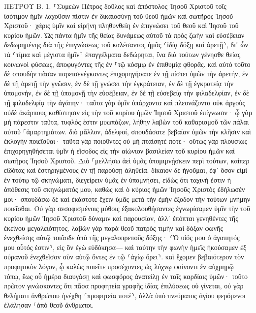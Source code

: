 \documentclass[twoside, 9pt]{extreport}
\begin{document}
ΠΕΤΡΟΥ Β.
1.
⸀Συμεὼν Πέτρος δοῦλος καὶ ἀπόστολος Ἰησοῦ Χριστοῦ τοῖς ἰσότιμον ἡμῖν λαχοῦσιν πίστιν ἐν δικαιοσύνῃ τοῦ θεοῦ ἡμῶν καὶ σωτῆρος Ἰησοῦ Χριστοῦ· 
χάρις ὑμῖν καὶ εἰρήνη πληθυνθείη ἐν ἐπιγνώσει τοῦ θεοῦ καὶ Ἰησοῦ τοῦ κυρίου ἡμῶν. 
Ὡς πάντα ἡμῖν τῆς θείας δυνάμεως αὐτοῦ τὰ πρὸς ζωὴν καὶ εὐσέβειαν δεδωρημένης διὰ τῆς ἐπιγνώσεως τοῦ καλέσαντος ἡμᾶς ⸂ἰδίᾳ δόξῃ καὶ ἀρετῇ⸃, 
δι᾽ ὧν τὰ ⸂τίμια καὶ μέγιστα ἡμῖν⸃ ἐπαγγέλματα δεδώρηται, ἵνα διὰ τούτων γένησθε θείας κοινωνοὶ φύσεως, ἀποφυγόντες τῆς ἐν ⸀τῷ κόσμῳ ἐν ἐπιθυμίᾳ φθορᾶς. 
καὶ αὐτὸ τοῦτο δὲ σπουδὴν πᾶσαν παρεισενέγκαντες ἐπιχορηγήσατε ἐν τῇ πίστει ὑμῶν τὴν ἀρετήν, ἐν δὲ τῇ ἀρετῇ τὴν γνῶσιν, 
ἐν δὲ τῇ γνώσει τὴν ἐγκράτειαν, ἐν δὲ τῇ ἐγκρατείᾳ τὴν ὑπομονήν, ἐν δὲ τῇ ὑπομονῇ τὴν εὐσέβειαν, 
ἐν δὲ τῇ εὐσεβείᾳ τὴν φιλαδελφίαν, ἐν δὲ τῇ φιλαδελφίᾳ τὴν ἀγάπην· 
ταῦτα γὰρ ὑμῖν ὑπάρχοντα καὶ πλεονάζοντα οὐκ ἀργοὺς οὐδὲ ἀκάρπους καθίστησιν εἰς τὴν τοῦ κυρίου ἡμῶν Ἰησοῦ Χριστοῦ ἐπίγνωσιν· 
ᾧ γὰρ μὴ πάρεστιν ταῦτα, τυφλός ἐστιν μυωπάζων, λήθην λαβὼν τοῦ καθαρισμοῦ τῶν πάλαι αὐτοῦ ⸀ἁμαρτημάτων. 
διὸ μᾶλλον, ἀδελφοί, σπουδάσατε βεβαίαν ὑμῶν τὴν κλῆσιν καὶ ἐκλογὴν ποιεῖσθαι· ταῦτα γὰρ ποιοῦντες οὐ μὴ πταίσητέ ποτε· 
οὕτως γὰρ πλουσίως ἐπιχορηγηθήσεται ὑμῖν ἡ εἴσοδος εἰς τὴν αἰώνιον βασιλείαν τοῦ κυρίου ἡμῶν καὶ σωτῆρος Ἰησοῦ Χριστοῦ. 
Διὸ ⸀μελλήσω ἀεὶ ὑμᾶς ὑπομιμνῄσκειν περὶ τούτων, καίπερ εἰδότας καὶ ἐστηριγμένους ἐν τῇ παρούσῃ ἀληθείᾳ. 
δίκαιον δὲ ἡγοῦμαι, ἐφ᾽ ὅσον εἰμὶ ἐν τούτῳ τῷ σκηνώματι, διεγείρειν ὑμᾶς ἐν ὑπομνήσει, 
εἰδὼς ὅτι ταχινή ἐστιν ἡ ἀπόθεσις τοῦ σκηνώματός μου, καθὼς καὶ ὁ κύριος ἡμῶν Ἰησοῦς Χριστὸς ἐδήλωσέν μοι· 
σπουδάσω δὲ καὶ ἑκάστοτε ἔχειν ὑμᾶς μετὰ τὴν ἐμὴν ἔξοδον τὴν τούτων μνήμην ποιεῖσθαι. 
Οὐ γὰρ σεσοφισμένοις μύθοις ἐξακολουθήσαντες ἐγνωρίσαμεν ὑμῖν τὴν τοῦ κυρίου ἡμῶν Ἰησοῦ Χριστοῦ δύναμιν καὶ παρουσίαν, ἀλλ᾽ ἐπόπται γενηθέντες τῆς ἐκείνου μεγαλειότητος. 
λαβὼν γὰρ παρὰ θεοῦ πατρὸς τιμὴν καὶ δόξαν φωνῆς ἐνεχθείσης αὐτῷ τοιᾶσδε ὑπὸ τῆς μεγαλοπρεποῦς δόξης· ⸂Ὁ υἱός μου ὁ ἀγαπητός μου οὗτός ἐστιν⸃, εἰς ὃν ἐγὼ εὐδόκησα— 
καὶ ταύτην τὴν φωνὴν ἡμεῖς ἠκούσαμεν ἐξ οὐρανοῦ ἐνεχθεῖσαν σὺν αὐτῷ ὄντες ἐν τῷ ⸂ἁγίῳ ὄρει⸃. 
καὶ ἔχομεν βεβαιότερον τὸν προφητικὸν λόγον, ᾧ καλῶς ποιεῖτε προσέχοντες ὡς λύχνῳ φαίνοντι ἐν αὐχμηρῷ τόπῳ, ἕως οὗ ἡμέρα διαυγάσῃ καὶ φωσφόρος ἀνατείλῃ ἐν ταῖς καρδίαις ὑμῶν· 
τοῦτο πρῶτον γινώσκοντες ὅτι πᾶσα προφητεία γραφῆς ἰδίας ἐπιλύσεως οὐ γίνεται, 
οὐ γὰρ θελήματι ἀνθρώπου ἠνέχθη ⸂προφητεία ποτέ⸃, ἀλλὰ ὑπὸ πνεύματος ἁγίου φερόμενοι ἐλάλησαν ⸀ἀπὸ θεοῦ ἄνθρωποι. 
\end{document}
